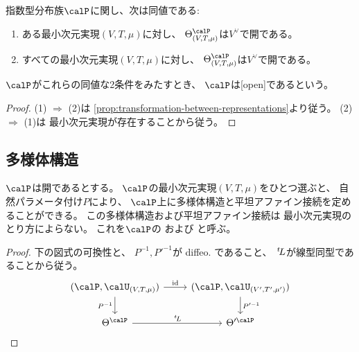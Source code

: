 \documentclass[report]{jlreq}
\begin{document}
\begin{remark}[正規分布族の最小次元実現]
    \TODO{}
\end{remark}

\begin{propdef}
    指数型分布族$\calP$に関し、次は同値である:
    \begin{enumerate}
        \item ある最小次元実現$(V, T, \mu)$に対し、
            $\Theta^\calP_{(V, T, \mu)}$は$V^\vee$で開である。
        \item すべての最小次元実現$(V, T, \mu)$に対し、
            $\Theta^\calP_{(V, T, \mu)}$は$V^\vee$で開である。
    \end{enumerate}
    $\calP$がこれらの同値な2条件をみたすとき、
    $\calP$は[open]であるという。
\end{propdef}

\begin{proof}
    (1) $\Rightarrow$ (2)は
    \cref{prop:transformation-between-representations}より従う。
    (2) $\Rightarrow$ (1)は
    最小次元実現が存在することから従う。
\end{proof}

\subsection{多様体構造}

\begin{propdef}
    $\calP$は開であるとする。
    $\calP$の最小次元実現$(V, T, \mu)$をひとつ選ぶと、
    自然パラメータ付け$P$により、
    $\calP$上に多様体構造と平坦アファイン接続を定めることができる。
    この多様体構造および平坦アファイン接続は
    最小次元実現のとり方によらない。
    これを$\calP$の
    および
    と呼ぶ。
\end{propdef}

\begin{proof}
    下の図式の可換性と、
    $P^{-1}, P'^{-1}$が diffeo. であること、
    $\,{}^{t}\!L$が線型同型であることから従う。
    \begin{equation}
        \begin{tikzcd}
            (\calP, \calU_{(V, T, \mu)})
                \ar{d}[swap]{P^{-1}}
                \ar{r}{\id}
                &(\calP, \calU_{(V', T', \mu')})
                    \ar{d}{P'^{-1}}
                \\
            \Theta^\calP
                \ar{r}{\up{t}L}
                &\Theta'^\calP
        \end{tikzcd}
    \end{equation}
\end{proof}
\end{document}
